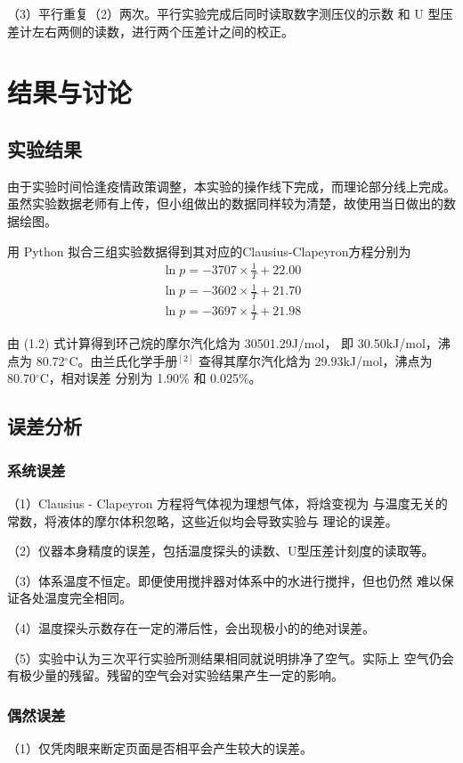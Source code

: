 \documentclass[12pt]{ctexart}
\numberwithin{equation}{section}
\begin{document}
（3）平行重复（2）两次。平行实验完成后同时读取数字测压仪的示数
和 U 型压差计左右两侧的读数，进行两个压差计之间的校正。

\section{结果与讨论}
\subsection{实验结果}
由于实验时间恰逢疫情政策调整，本实验的操作线下完成，而理论部分线上完成。虽然实验数据老师有上传，但小组做出的数据同样较为清楚，故使用当日做出的数据绘图。

用 Python 拟合三组实验数据得到其对应的Clausius-Clapeyron方程分别为
\begin{align}
    \ln p = -3707 \times \frac{1}{T} + 22.00 \\
    \ln p = -3602 \times \frac{1}{T} + 21.70 \\
    \ln p = -3697 \times \frac{1}{T} + 21.98
\end{align}

由 (1.2) 式计算得到环己烷的摩尔汽化焓为 30501.29J/mol，
即 30.50kJ/mol，沸点为 80.72$^\circ$C。由兰氏化学手册$^{[2]}$
查得其摩尔汽化焓为 29.93kJ/mol，沸点为 80.70$^\circ$C，相对误差
分别为 1.90\% 和 0.025\%。

\subsection{误差分析}
\subsubsection{系统误差}
（1）Clausius - Clapeyron 方程将气体视为理想气体，将焓变视为
与温度无关的常数，将液体的摩尔体积忽略，这些近似均会导致实验与
理论的误差。

（2）仪器本身精度的误差，包括温度探头的读数、U型压差计刻度的读取等。

（3）体系温度不恒定。即便使用搅拌器对体系中的水进行搅拌，但也仍然
难以保证各处温度完全相同。

（4）温度探头示数存在一定的滞后性，会出现极小的的绝对误差。

（5）实验中认为三次平行实验所测结果相同就说明排净了空气。实际上
空气仍会有极少量的残留。残留的空气会对实验结果产生一定的影响。

\subsubsection{偶然误差}
（1）仅凭肉眼来断定页面是否相平会产生较大的误差。
\end{document}
